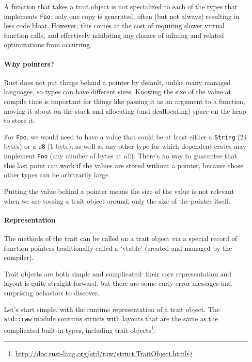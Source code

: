 \documentclass[a4paper,]{book}
\renewcommand{\href}[2]{#2\footnote{\url{#1}}}
\let\oldparagraph\paragraph
\renewcommand{\paragraph}[1]{\oldparagraph{#1}\mbox{}}
\begin{document}
A function that takes a trait object is not specialized to each of the
types that implements \texttt{Foo}: only one copy is generated, often
(but not always) resulting in less code bloat. However, this comes at
the cost of requiring slower virtual function calls, and effectively
inhibiting any chance of inlining and related optimizations from
occurring.

\paragraph{Why pointers?}\label{why-pointers}

Rust does not put things behind a pointer by default, unlike many
managed languages, so types can have different sizes. Knowing the size
of the value at compile time is important for things like passing it as
an argument to a function, moving it about on the stack and allocating
(and deallocating) space on the heap to store it.

For \texttt{Foo}, we would need to have a value that could be at least
either a \texttt{String} (24 bytes) or a \texttt{u8} (1 byte), as well
as any other type for which dependent crates may implement \texttt{Foo}
(any number of bytes at all). There's no way to guarantee that this last
point can work if the values are stored without a pointer, because those
other types can be arbitrarily large.

Putting the value behind a pointer means the size of the value is not
relevant when we are tossing a trait object around, only the size of the
pointer itself.

\paragraph{Representation}\label{representation}

The methods of the trait can be called on a trait object via a special
record of function pointers traditionally called a `vtable' (created and
managed by the compiler).

Trait objects are both simple and complicated: their core representation
and layout is quite straight-forward, but there are some curly error
messages and surprising behaviors to discover.

Let's start simple, with the runtime representation of a trait object.
The \texttt{std::raw} module contains structs with layouts that are the
same as the complicated built-in types,
\href{http://doc.rust-lang.org/std/raw/struct.TraitObject.html}{including
trait objects}:
\end{document}
